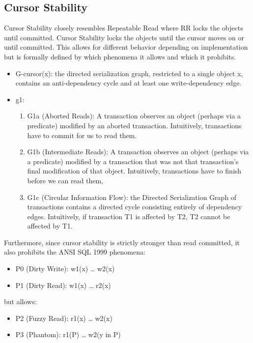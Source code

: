 \documentclass[a4paper,10pt,titlepage]{report}
\begin{document}
\newpage
\subsection{Cursor Stability}
Cursor Stability closely resembles Repeatable Read where RR locks the objects until committed. Cursor Stability locks the objects until the cursor moves on or until committed. This allows for different behavior depending on implementation but is formally defined by which phenomena it allows and which it prohibits. \cite{Adya99weakconsistency}\\
\begin{itemize}
    \item G-cursor(x): the directed serialization graph, restricted to a single object x, contains an anti-dependency cycle and at least one write-dependency edge.
    \item g1:
    \begin{enumerate}
        \item G1a (Aborted Reads): A transaction observes an object (perhaps via a predicate) modified by an aborted transaction. Intuitively, transactions have to commit for us to read them.
        \item G1b (Intermediate Reads): A transaction observes an object (perhaps via a predicate) modified by a transaction that was not that transaction's final modification of that object. Intuitively, transactions have to finish before we can read them,
        \item G1c (Circular Information Flow): the Directed Serialization Graph of transactions contains a directed cycle consisting entirely of dependency edges. Intuitively, if transaction T1 is affected by T2, T2 cannot be affected by T1.
    \end{enumerate}
\end{itemize}
Furthermore, since cursor stability is strictly stronger than read committed, it also prohibits the ANSI SQL 1999 \cite{ansisql1999} phenomena:
\begin{itemize}
    \item P0 (Dirty Write): w1(x) … w2(x)
    \item P1 (Dirty Read): w1(x) … r2(x)
\end{itemize}

but allows:
\begin{itemize}
    \item P2 (Fuzzy Read): r1(x) … w2(x)
    \item P3 (Phantom): r1(P) … w2(y in P)
\end{itemize}
\end{document}
